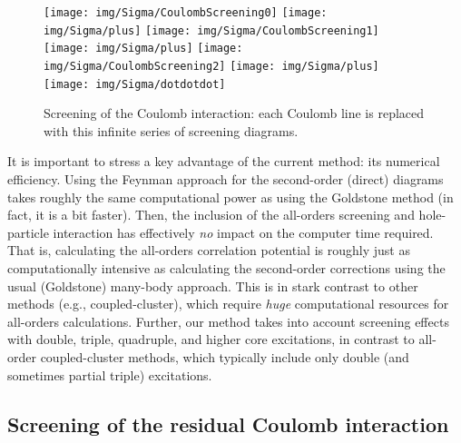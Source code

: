 \documentclass[10pt,twocolumn,a4paper]{article}%
\begin{document}
\begin{figure}%
\centering
\texttt{[image: img/Sigma/CoulombScreening0]}
\texttt{[image: img/Sigma/plus]}
\texttt{[image: img/Sigma/CoulombScreening1]}
\texttt{[image: img/Sigma/plus]}
\texttt{[image: img/Sigma/CoulombScreening2]}
\texttt{[image: img/Sigma/plus]}
\texttt{[image: img/Sigma/dotdotdot]}
\caption{\label{fig:Screening}\small Screening of the Coulomb interaction: each Coulomb line is replaced with this infinite series of screening diagrams.}
\end{figure}



It is important to stress a key advantage of the current method: its numerical efficiency.
Using the Feynman approach for the second-order (direct) diagrams takes roughly the same computational power as using the Goldstone method (in fact, it is a bit faster).
Then, the inclusion of the all-orders screening and hole-particle interaction has effectively {\em no} impact on the computer time required.
That is, calculating the all-orders correlation potential is roughly just as computationally intensive as calculating the second-order  corrections using the usual (Goldstone) many-body approach.
This is in stark contrast to other methods (e.g., coupled-cluster), which require {\em huge} computational resources for all-orders calculations.
%
Further, our method takes into account screening effects with double, triple, quadruple, and higher core  excitations, in contrast to all-order coupled-cluster methods, which typically include only double (and sometimes partial triple) excitations.

\subsection{Screening of the residual Coulomb interaction}
\end{document}
